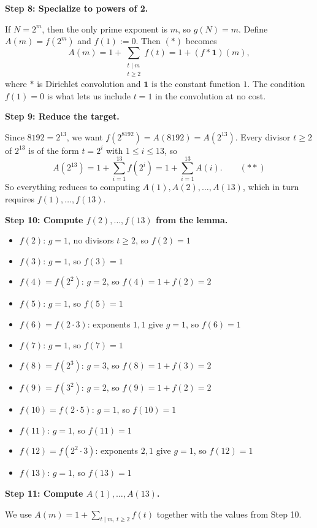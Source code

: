 \begin{enumerate}
 \textbf{Step 8: Specialize to powers of 2.}

 If $N=2^m$, then the only prime exponent is $m$, so $g(N)=m$. Define $A(m)=f(2^m)$ and $f(1):=0$. Then $(\ast)$ becomes
 \[A(m)=1+\sum_{\substack{t\mid m\\ t\ge2}}f(t)=1+(f*\mathbf{1})(m),\]where $*$ is Dirichlet convolution and $\mathbf 1$ is the constant function $1$. The condition $f(1)=0$ is what lets us include $t=1$ in the convolution at no cost.

 \textbf{Step 9: Reduce the target.}

 Since $8192=2^{13}$, we want $f(2^{8192})=A(8192)=A(2^{13})$. Every divisor $t\ge2$ of $2^{13}$ is of the form $t=2^i$ with $1\le i\le13$, so
 \[A(2^{13})=1+\sum_{i=1}^{13}f(2^i)=1+\sum_{i=1}^{13}A(i).\qquad(\ast\ast)\]So everything reduces to computing $A(1),A(2),\dots,A(13)$, which in turn requires $f(1),\dots,f(13)$.

 \textbf{Step 10: Compute $f(2),\dots,f(13)$ from the lemma.}

 
            \begin{itemize}
        \item $f(2)$: $g=1$, no divisors $t\ge2$, so $f(2)=1$
        \item $f(3)$: $g=1$, so $f(3)=1$
        \item $f(4)=f(2^2)$: $g=2$, so $f(4)=1+f(2)=2$
        \item $f(5)$: $g=1$, so $f(5)=1$
        \item $f(6)=f(2\cdot3)$: exponents $1,1$ give $g=1$, so $f(6)=1$
        \item $f(7)$: $g=1$, so $f(7)=1$
        \item $f(8)=f(2^3)$: $g=3$, so $f(8)=1+f(3)=2$
        \item $f(9)=f(3^2)$: $g=2$, so $f(9)=1+f(2)=2$
        \item $f(10)=f(2\cdot5)$: $g=1$, so $f(10)=1$
        \item $f(11)$: $g=1$, so $f(11)=1$
        \item $f(12)=f(2^2\cdot3)$: exponents $2,1$ give $g=1$, so $f(12)=1$
        \item $f(13)$: $g=1$, so $f(13)=1$
            \end{itemize}
            \textbf{Step 11: Compute $A(1),\dots,A(13)$.}

 We use $A(m)=1+\sum_{t\mid m,\,t\ge2}f(t)$ together with the values from Step 10.


\end{enumerate}
